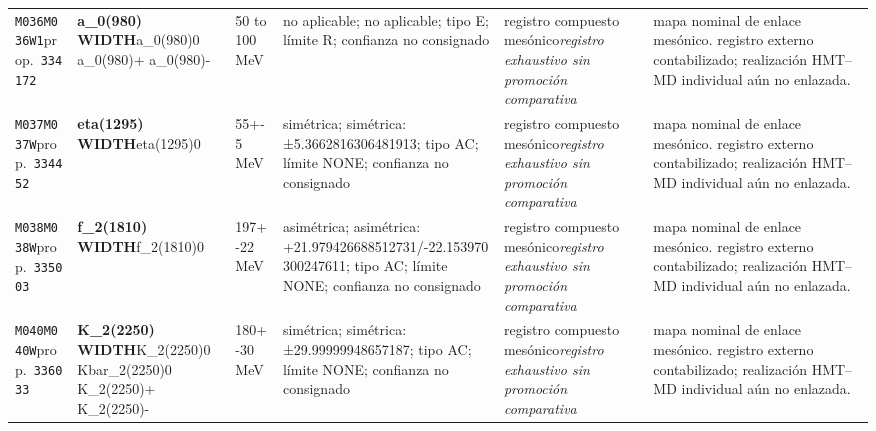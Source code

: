 \begin{landscape}
\begin{longtable}{L{1.85cm}L{4.45cm}L{2.35cm}L{4.05cm}L{3.35cm}L{7.15cm}}
\texttt{M036}\newline \texttt{M036W1}\newline prop.\ \texttt{334172} & \textbf{a\_\allowbreak{}0(980) WIDTH}\newline a\_\allowbreak{}0(980)0 \textbar{}\allowbreak{} a\_\allowbreak{}0(980)+ \textbar{}\allowbreak{} a\_\allowbreak{}0(980)- & 50 to 100\,MeV & no aplicable; no aplicable; tipo E; límite R; confianza no consignado & registro compuesto mesónico\newline \emph{registro exhaustivo sin promoción comparativa} & mapa nominal de enlace mesónico. registro externo contabilizado; realización HMT--MD individual aún no enlazada. \\
\texttt{M037}\newline \texttt{M037W}\newline prop.\ \texttt{334452} & \textbf{eta(1295) WIDTH}\newline eta(1295)0 & 55+-5\,MeV & simétrica; simétrica: ±5.3662816306481913; tipo AC; límite NONE; confianza no consignado & registro compuesto mesónico\newline \emph{registro exhaustivo sin promoción comparativa} & mapa nominal de enlace mesónico. registro externo contabilizado; realización HMT--MD individual aún no enlazada. \\
\texttt{M038}\newline \texttt{M038W}\newline prop.\ \texttt{335003} & \textbf{f\_\allowbreak{}2(1810) WIDTH}\newline f\_\allowbreak{}2(1810)0 & 197+-22\,MeV & asimétrica; asimétrica: +21.979426688512731/-22.153970300247611; tipo AC; límite NONE; confianza no consignado & registro compuesto mesónico\newline \emph{registro exhaustivo sin promoción comparativa} & mapa nominal de enlace mesónico. registro externo contabilizado; realización HMT--MD individual aún no enlazada. \\
\texttt{M040}\newline \texttt{M040W}\newline prop.\ \texttt{336033} & \textbf{K\_\allowbreak{}2(2250) WIDTH}\newline K\_\allowbreak{}2(2250)0 \textbar{}\allowbreak{} Kbar\_\allowbreak{}2(2250)0 \textbar{}\allowbreak{} K\_\allowbreak{}2(2250)+ \textbar{}\allowbreak{} K\_\allowbreak{}2(2250)- & 180+-30\,MeV & simétrica; simétrica: ±29.99999948657187; tipo AC; límite NONE; confianza no consignado & registro compuesto mesónico\newline \emph{registro exhaustivo sin promoción comparativa} & mapa nominal de enlace mesónico. registro externo contabilizado; realización HMT--MD individual aún no enlazada. \\

\end{longtable}
\end{landscape}
